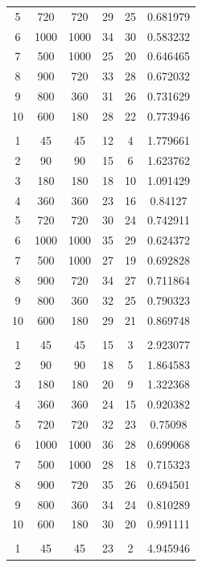 \documentclass[10pt]{article}
\begin{document}
\begin{table}[H]
\begin{tabular}{cccccc}
        5  & 720  & 720  & 29 & 25 & 0.681979 \\
        6  & 1000 & 1000 & 34 & 30 & 0.583232 \\
        7  & 500  & 1000 & 25 & 20 & 0.646465 \\
        8  & 900  & 720  & 33 & 28 & 0.672032 \\
        9  & 800  & 360  & 31 & 26 & 0.731629 \\
        10 & 600  & 180  & 28 & 22 & 0.773946 \\
           &      &      &    &    & \\
        1  & 45   & 45   & 12 & 4  & 1.779661 \\
        2  & 90   & 90   & 15 & 6  & 1.623762 \\
        3  & 180  & 180  & 18 & 10 & 1.091429 \\
        4  & 360  & 360  & 23 & 16 & 0.84127 \\
        5  & 720  & 720  & 30 & 24 & 0.742911 \\
        6  & 1000 & 1000 & 35 & 29 & 0.624372 \\
        7  & 500  & 1000 & 27 & 19 & 0.692828 \\
        8  & 900  & 720  & 34 & 27 & 0.711864 \\
        9  & 800  & 360  & 32 & 25 & 0.790323 \\
        10 & 600  & 180  & 29 & 21 & 0.869748 \\
           &      &      &    &    & \\
        1  & 45   & 45   & 15 & 3  & 2.923077 \\
        2  & 90   & 90   & 18 & 5  & 1.864583 \\
        3  & 180  & 180  & 20 & 9  & 1.322368 \\
        4  & 360  & 360  & 24 & 15 & 0.920382 \\
        5  & 720  & 720  & 32 & 23 & 0.75098 \\
        6  & 1000 & 1000 & 36 & 28 & 0.699068 \\
        7  & 500  & 1000 & 28 & 18 & 0.715323 \\
        8  & 900  & 720  & 35 & 26 & 0.694501 \\
        9  & 800  & 360  & 34 & 24 & 0.810289 \\
        10 & 600  & 180  & 30 & 20 & 0.991111 \\
           &      &      &    &    & \\
        1  & 45   & 45   & 23 & 2  & 4.945946 \\

\end{tabular}
\end{table}
\end{document}
